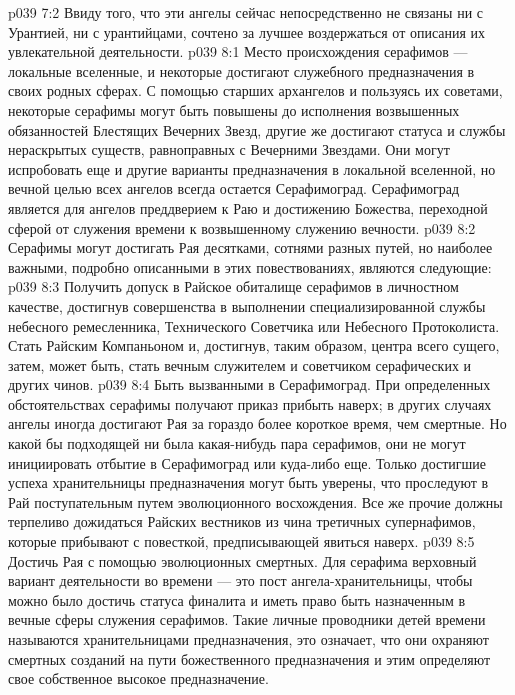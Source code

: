 \vs p039 7:2 Ввиду того, что эти ангелы сейчас непосредственно не связаны ни с Урантией, ни с урантийцами, сочтено за лучшее воздержаться от описания их увлекательной деятельности.
\vs p039 8:1 Место происхождения серафимов --- локальные вселенные, и некоторые достигают служебного предназначения в своих родных сферах. С помощью старших архангелов и пользуясь их советами, некоторые серафимы могут быть повышены до исполнения возвышенных обязанностей Блестящих Вечерних Звезд, другие же достигают статуса и службы нераскрытых существ, равноправных с Вечерними Звездами. Они могут испробовать еще и другие варианты предназначения в локальной вселенной, но вечной целью всех ангелов всегда остается Серафимоград. Серафимоград является для ангелов преддверием к Раю и достижению Божества, переходной сферой от служения времени к возвышенному служению вечности.
\vs p039 8:2 \pc Серафимы могут достигать Рая десятками, сотнями разных путей, но наиболее важными, подробно описанными в этих повествованиях, являются следующие:
\vs p039 8:3 \bibnobreakspace Получить допуск в Райское обиталище серафимов в личностном качестве, достигнув совершенства в выполнении специализированной службы небесного ремесленника, Технического Советчика или Небесного Протоколиста. Стать Райским Компаньоном и, достигнув, таким образом, центра всего сущего, затем, может быть, стать вечным служителем и советчиком серафических и других чинов.
\vs p039 8:4 \pc {}\bibnobreakspace Быть вызванными в Серафимоград. При определенных обстоятельствах серафимы получают приказ прибыть наверх; в других случаях ангелы иногда достигают Рая за гораздо более короткое время, чем смертные. Но какой бы подходящей ни была какая\hyp{}нибудь пара серафимов, они не могут инициировать отбытие в Серафимоград или куда\hyp{}либо еще. Только достигшие успеха хранительницы предназначения могут быть уверены, что проследуют в Рай поступательным путем эволюционного восхождения. Все же прочие должны терпеливо дожидаться Райских вестников из чина третичных супернафимов, которые прибывают с повесткой, предписывающей явиться наверх.
\vs p039 8:5 \pc {}\bibnobreakspace Достичь Рая с помощью эволюционных смертных. Для серафима верховный вариант деятельности во времени --- это пост ангела\hyp{}хранительницы, чтобы можно было достичь статуса финалита и иметь право быть назначенным в вечные сферы служения серафимов. Такие личные проводники детей времени называются хранительницами предназначения, это означает, что они охраняют смертных созданий на пути божественного предназначения и этим определяют свое собственное высокое предназначение.
